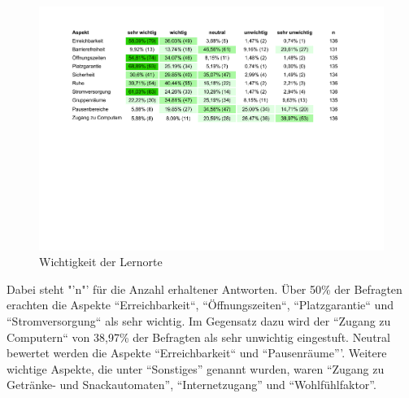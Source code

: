 \documentclass[11pt, a4paper]{article}
\begin{document}
\begin{figure}[htbp]
	\vspace*{6.2cm}
	\hspace*{-1.75cm}
	\includegraphics[scale = 0.74, trim=0.5cm 11cm 0.5cm 11cm]{Tabellen.pdf}
		\vspace{-0.2cm}
	\caption{Wichtigkeit der Lernorte}
	\vspace{0.1cm}
\end{figure}
   Dabei steht "'n"' für die Anzahl erhaltener Antworten. Über 50\% der Befragten erachten die Aspekte “Erreichbarkeit“, “Öffnungszeiten“, “Platzgarantie“ und “Stromversorgung“ als sehr wichtig. Im Gegensatz dazu wird der “Zugang zu Computern“ von 38,97\% der Befragten als sehr unwichtig eingestuft. Neutral bewertet werden die Aspekte “Erreichbarkeit“ und “Pausenräume”'. Weitere wichtige Aspekte, die unter “Sonstiges” genannt wurden, waren “Zugang zu Getränke- und Snackautomaten”, “Internetzugang” und “Wohlfühlfaktor”.
\end{document}
